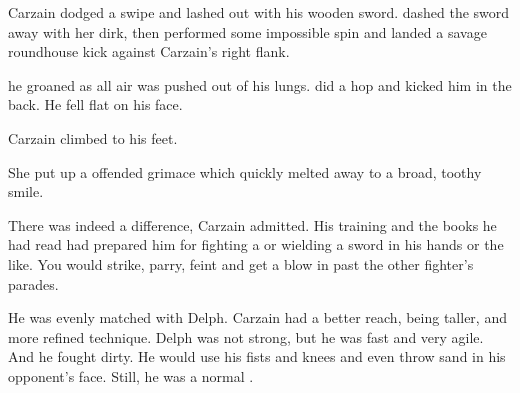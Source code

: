 \begin{comment}
Carzain talks to \Racel. 
It turns out that \Racel{} was sent on this mission because she is Pelidorian. 

She dislikes his friends, calling them uncouth. 
Carzain laughs. 
\ta{This isn't the \TopazChateau. 
This is an army. 
Those guys are soldiers. 
Their purpose is to kill people. 
What did you expect?}
\end{comment}









\begin{comment}
\subsection{Practice}
\end{comment}

\new
Carzain dodged a swipe and lashed out with his wooden sword. 
\Tsekkect{} dashed the sword away with her dirk, then performed some impossible spin and landed a savage roundhouse kick against Carzain's right flank. 

 he groaned as all air was pushed out of his lungs. 
\Tsekkect{} did a hop and kicked him in the back. 
He fell flat on his face. 

Carzain climbed to his feet. 

She put up a offended grimace which quickly melted away to a broad, toothy smile. 

There was indeed a difference, Carzain admitted. 
His training and the books he had read had prepared him for fighting a \human{} or \scatha{} wielding a sword in his hands or the like. 
You would strike, parry, feint and get a blow in past the other fighter's parades. 

He was evenly matched with Delph. 
Carzain had a better reach, being taller, and more refined technique. 
Delph was not strong, but he was fast and very agile. 
And he fought dirty. 
He would use his fists and knees and even throw sand in his opponent's face. 
Still, he was a normal \human{}. 

